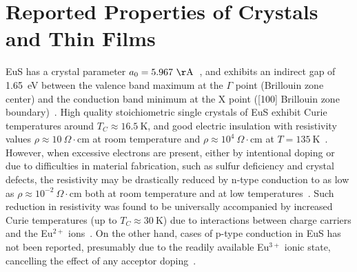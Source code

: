 \section{Reported Properties of Crystals and Thin Films}
EuS has a crystal parameter $a_0=5.967~\mathrm\AA$~\cite{EuS_Shafer}, and exhibits an indirect gap of 1.65~eV between the valence band maximum at the $\Gamma$ point (Brillouin zone center) and the conduction band minimum at the X point ([100] Brillouin zone boundary)~\cite{EuX_absorption, EuS_band_th1, EuS_band_th2}. High quality stoichiometric single crystals of EuS exhibit Curie temperatures around $T_C\approx16.5~\mathrm{K}$, and good electric insulation with resistivity values $\rho\approx10~\Omega\cdot\mathrm{cm}$ at room temperature and $\rho\approx10^4~\Omega\cdot\mathrm{cm}$ at $T=135~\mathrm{K}$~\cite{EuS_Shafer}. However, when excessive electrons are present, either by intentional doping or due to difficulties in material fabrication, such as sulfur deficiency and crystal defects, the resistivity may be drastically reduced by n-type conduction to as low as $\rho\approx10^{-2}~\Omega\cdot\mathrm{cm}$ both at room temperature and at low temperatures~\cite{EuS_LaDoped, EuS_ntype}. Such reduction in resistivity was found to be universally accompanied by increased Curie temperatures (up to $T_C\approx30~\mathrm{K}$) due to interactions between charge carriers and the Eu$^{2+}$ ions~\cite{EuS_TC_doping, EuS_ntype, EuX_doped_transport, EuX_RKKY}. On the other hand, cases of p-type conduction in EuS has not been reported, presumably due to the readily available Eu$^{3+}$ ionic state, cancelling the effect of any acceptor doping~\cite{EuX_doped_transport}.